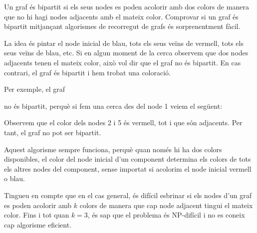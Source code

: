 
Un graf és bipartit si els seus nodes es poden acolorir amb dos colors
de manera que no hi hagi nodes adjacents amb el mateix
color. Comprovar si un graf és bipartit mitjançant algorismes de
recorregut de grafs és sorprenentment fàcil.

La idea és pintar el node inicial de blau, tots els seus veïns de
vermell, tots els seus veïns de blau, etc. Si en algun moment de la
cerca observem que dos nodes adjacents tenen el mateix color, això vol
dir que el graf no és bipartit. En cas contrari, el graf és bipartit i
hem trobat una coloració.

Per exemple, el graf
\begin{center}
\end{center}
no és bipartit, perquè si fem una cerca des del node 1 veiem el següent:
\begin{center}
\end{center}
Observem que el color dels nodes 2 i 5 és vermell, tot i que són
adjacents. Per tant, el graf no pot ser bipartit.

Aquest algorisme sempre funciona, perquè quan només hi ha dos colors
disponibles, el color del node inicial d'un component determina els
colors de tots els altres nodes del component, sense importat si
acolorim el node inicial vermell o blau.

Tingueu en compte que en el cas general, és difícil esbrinar si els
nodes d'un graf es poden acolorir amb $k$ colors de manera que cap
node adjacent tingui el mateix color. Fins i tot quan $k=3$, és sap
que el problema és NP-difícil i no es coneix cap algorisme eficient.


